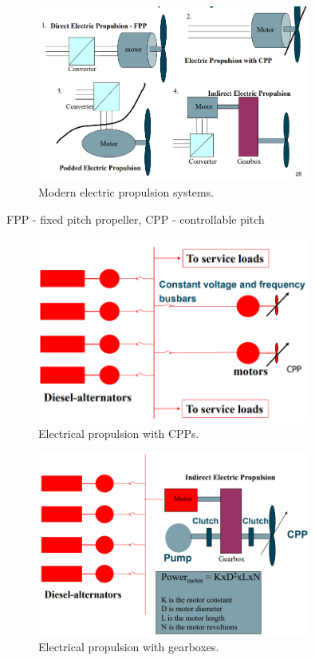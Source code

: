 \begin{figure}[H]
    \centering
    \includegraphics[width = 0.8\textwidth]{img/figure58.png}
    \caption{Modern electric propulsion systems.}
\end{figure}
FPP - fixed pitch propeller, CPP - controllable pitch

\begin{figure}[H]
    \centering
    \includegraphics[width = 0.8\textwidth]{img/figure59.png}
    \caption{Electrical propulsion with CPPs.}
\end{figure}

\begin{figure}[H]
    \centering
    \includegraphics[width = 0.8\textwidth]{img/figure60.png}
    \caption{Electrical propulsion with gearboxes.}
\end{figure}

